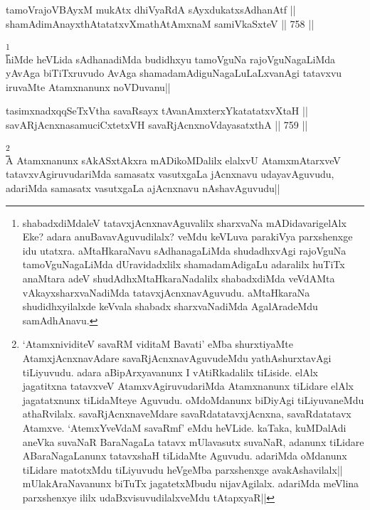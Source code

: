 \begin{shl}
tamoVrajoVBAyxM mukAtx dhiVyaRdA sAyxdukatxsAdhanAtf || \\
shamAdimAnayxthAtatatxvXmathA\s \s tAmxnaM samiVkaSxteV ||  758 ||  
\end{shl}

\begin{artha} 
\footnote[3]{shabadxdiMdaleV tatavxjAcnxnavAguvalilx sharxvaNa 
mADidavarigelAlx Eke? adara anuBavavAguvudilalx? veMdu keVLuva 
parakiVya parxshenxge idu utatxra. aMtaHkaraNavu sAdhanagaLiMda 
shudadhxvAgi rajoVguNa tamoVguNagaLiMda dUravidadxlilx shamadamAdigaLu 
adaralilx huTiTx anaMtara adeV shudAdhxMtaHkaraNadalilx shabadxdiMda 
veVdAMta vAkayxsharxvaNadiMda tatavxjAcnxnavAguvudu. aMtaHkaraNa 
shudidhxyilalxde keVvala shabadx sharxvaNadiMda AgalAradeMdu 
samAdhAnavu.}\\
hiMde heVLida sAdhanadiMda budidhxyu tamoVguNa rajoVguNagaLiMda yAvAga 
biTiTxruvudo AvAga shamadamAdiguNagaLuLaLxvanAgi tatavxvu iruvaMte 
Atamxnanunx noVDuvanu||
\end{artha}

\begin{shl}
tasimxnadxqqSeTxV\s tha savaRsayx tAvanAmxterxYkatatatxvXtaH || \\
savARjAcnxnasamuciCxtetxVH savaRjAcnxnoVdayasatxthA ||  759 ||  
\end{shl}

\begin{artha} 
\footnote[4]{`AtamxnividiteV savaRM viditaM Bavati' eMba shurxtiyaMte 
AtamxjAcnxnavAdare savaRjAcnxnavAguvudeMdu yathAshurxtavAgi 
tiLiyuvudu. adara aBipArxyavanunx I vAtiRkadalilx tiLiside. elAlx 
jagatitxna tatavxveV AtamxvAgiruvudariMda Atamxnanunx tiLidare elAlx 
jagatatxnunx tiLidaMteye Aguvudu. oMdoMdanunx biDiyAgi tiLiyuvaneMdu 
athaRvilalx. savaRjAcnxnaveMdare savaRdatatavxjAcnxna, savaRdatatavx 
Atamxve. `AtemxYveVdaM savaRmf' eMdu heVLide. kaTaka, kuMDalAdi aneVka 
suvaNaR BaraNagaLa tatavx mUlavasutx suvaNaR, adanunx tiLidare 
ABaraNagaLanunx tatavxshaH tiLidaMte Aguvudu. adariMda oMdanunx 
tiLidare matotxMdu tiLiyuvudu heVgeMba parxshenxge avakAshavilalx||\\
mUlakAraNavanunx biTuTx jagatetxMbudu nijavAgilalx. adariMda meVlina 
parxshenxye ililx udaBxvisuvudilalxveMdu tAtapxyaR||}\\
A Atamxnanunx sAkASxtAkxra mADikoMDalilx elalxvU AtamxmAtarxveV 
tatavxvAgiruvudariMda samasatx vasutxgaLa jAcnxnavu udayavAguvudu, 
adariMda samasatx vasutxgaLa ajAcnxnavu nAshavAguvudu|| 
\end{artha}

